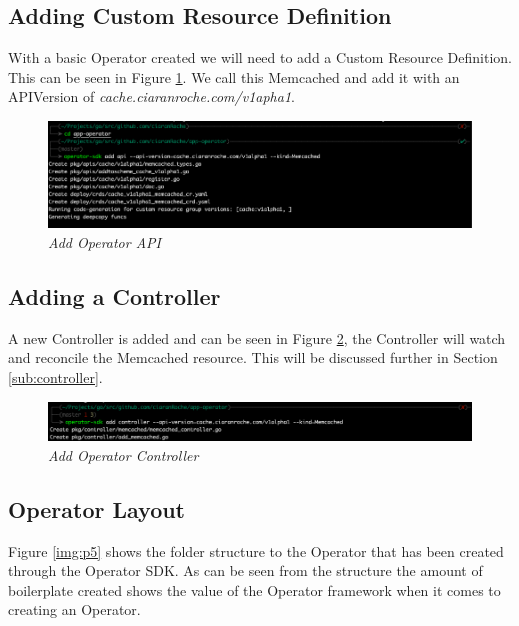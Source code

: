 \newpage
\subsection{Adding Custom Resource Definition}
With a basic Operator created we will need to add a Custom Resource Definition. This can be seen in Figure \ref{img:p3}. We call this Memcached and add it with an APIVersion of \textit{cache.ciaranroche.com/v1apha1}.

\begin{figure}[!ht]
\centering
\includegraphics*[width=1\textwidth]{images/p3.png}
\caption{\em Add Operator API}
\label{img:p3}
\end{figure}

\subsection{Adding a Controller}
\label{sub:addcon}
A new Controller is added and can be seen in Figure \ref{img:p4}, the Controller will watch and reconcile the Memcached resource. This will be discussed further in Section \ref{sub:controller}.
\begin{figure}[!ht]
\centering
\includegraphics*[width=1\textwidth]{images/p4.png}
\caption{\em Add Operator Controller}
\label{img:p4}
\end{figure}

\newpage
\subsection{Operator Layout}
Figure \ref{img:p5} shows the folder structure to the Operator that has been created through the Operator SDK. As can be seen from the structure the amount of boilerplate created shows the value of the Operator framework when it comes to creating an Operator.

